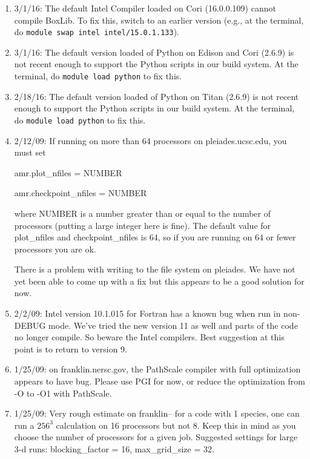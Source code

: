 \begin{enumerate}

\item 3/1/16: The default Intel Compiler loaded on Cori (16.0.0.109)
  cannot compile BoxLib. To fix this, switch to an earlier version
  (e.g., at the terminal, do {\tt module swap intel intel/15.0.1.133}).

\item 3/1/16: The default version loaded of Python on Edison and Cori (2.6.9) is not recent enough to support the Python scripts in our build system. At the terminal, do {\tt module load python} to fix this.

\item 2/18/16: The default version loaded of Python on Titan (2.6.9) is not recent enough to support the Python scripts in our build system. At the terminal, do {\tt module load python} to fix this.

\item 2/12/09: If running on more than 64 processors on pleiades.ucsc.edu, you must set

amr.plot\_nfiles = NUMBER

amr.checkpoint\_nfiles = NUMBER

where NUMBER is a number greater than or equal to the number of processors (putting a large integer here is fine). The default value for plot\_nfiles and checkpoint\_nfiles is 64, so if you are running on 64 or fewer processors you are ok.

There is a problem with writing to the file system on pleiades. We have not yet been able to come up with a fix but this appears to be a good solution for now.

\item 2/2/09: Intel version 10.1.015 for Fortran has a known bug when run in non-DEBUG mode. We've tried the new version 11 as well and parts of the code no longer compile. So beware the Intel compilers. Best suggestion at this point is to return to version 9.

\item 1/25/09: on franklin.nersc.gov, the PathScale compiler with full optimization appears to have bug. Please use PGI for now, or reduce the optimization from -O to -O1 with PathScale.

\item 1/25/09: Very rough estimate on franklin-- for a code with 1 species, one can run a $256^3$ calculation on 16 processors but not 8. Keep this in mind as you choose the number of processors for a given job. Suggested settings for large 3-d runs: blocking\_factor = 16, max\_grid\_size = 32. 
\end{enumerate}


